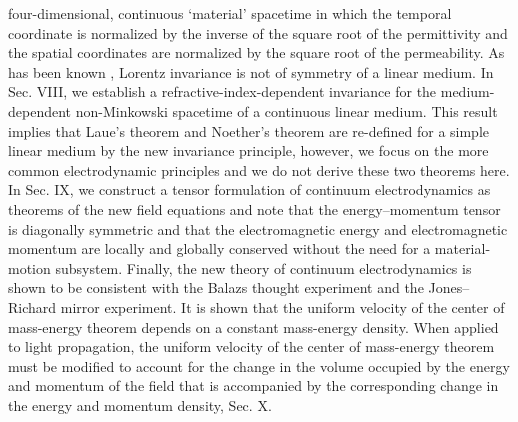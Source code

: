 \documentclass[twocolumn,amssymb,eqsecnum,aps,pra]{revtex4-2}
\begin{document}
four-dimensional, continuous `material' spacetime in which the
temporal coordinate is normalized by the inverse of the square
root of the permittivity and the spatial coordinates are normalized
by the square root of the permeability.
As has been known \cite{BIFinn}, Lorentz invariance is not of
symmetry of a linear medium.
In Sec. VIII, we establish a refractive-index-dependent invariance for the
medium-dependent non-Minkowski spacetime of a continuous linear medium.
This result implies that Laue's theorem \cite{BIGiu,BIWang2}
and Noether's theorem \cite{BINoether} are re-defined
for a simple linear medium by the new invariance principle, however,
we focus on the more common electrodynamic principles and we do
not derive these two theorems here.
In Sec. IX, we construct a tensor formulation of continuum
electrodynamics as theorems of the new field equations and note
that the energy--momentum tensor is diagonally symmetric and that the
electromagnetic energy and electromagnetic momentum are locally
and globally conserved without the need for a material-motion
subsystem.
Finally, the new theory of continuum electrodynamics is shown to be
consistent with the Balazs \cite{BIBalazs} thought experiment and the 
Jones--Richard \cite{BIExp} mirror experiment.
It is shown that the uniform velocity of the center of mass-energy
theorem depends on a constant mass-energy density.
When applied to light propagation, the uniform velocity of the center
of mass-energy theorem \cite{BIExp} must be modified to account for
the change in the volume occupied by the energy and momentum of the
field that is accompanied by the corresponding change in the energy
and momentum density, Sec. X.
\par
\end{document}
